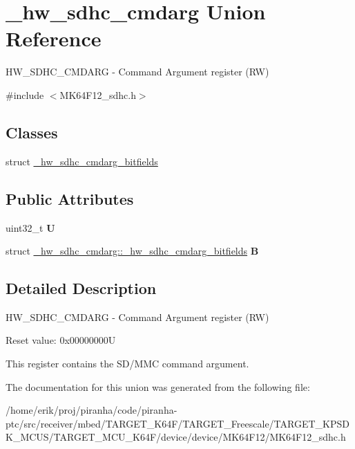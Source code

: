 \hypertarget{union__hw__sdhc__cmdarg}{}\section{\+\_\+hw\+\_\+sdhc\+\_\+cmdarg Union Reference}
\label{union__hw__sdhc__cmdarg}


H\+W\+\_\+\+S\+D\+H\+C\+\_\+\+C\+M\+D\+A\+RG -\/ Command Argument register (RW)  




{\ttfamily \#include $<$M\+K64\+F12\+\_\+sdhc.\+h$>$}

\subsection*{Classes}
\begin{DoxyCompactItemize}
\item 
struct \hyperlink{struct__hw__sdhc__cmdarg_1_1__hw__sdhc__cmdarg__bitfields}{\+\_\+hw\+\_\+sdhc\+\_\+cmdarg\+\_\+bitfields}
\end{DoxyCompactItemize}
\subsection*{Public Attributes}
\begin{DoxyCompactItemize}
\item 
uint32\+\_\+t {\bfseries U}\hypertarget{union__hw__sdhc__cmdarg_ace11d1953553df892385fde5b2fcf5ae}{}\label{union__hw__sdhc__cmdarg_ace11d1953553df892385fde5b2fcf5ae}

\item 
struct \hyperlink{struct__hw__sdhc__cmdarg_1_1__hw__sdhc__cmdarg__bitfields}{\+\_\+hw\+\_\+sdhc\+\_\+cmdarg\+::\+\_\+hw\+\_\+sdhc\+\_\+cmdarg\+\_\+bitfields} {\bfseries B}\hypertarget{union__hw__sdhc__cmdarg_ac779ce4e8a44258e2c36f37a4cb98b4e}{}\label{union__hw__sdhc__cmdarg_ac779ce4e8a44258e2c36f37a4cb98b4e}

\end{DoxyCompactItemize}


\subsection{Detailed Description}
H\+W\+\_\+\+S\+D\+H\+C\+\_\+\+C\+M\+D\+A\+RG -\/ Command Argument register (RW) 

Reset value\+: 0x00000000U

This register contains the S\+D/\+M\+MC command argument. 

The documentation for this union was generated from the following file\+:\begin{DoxyCompactItemize}
\item 
/home/erik/proj/piranha/code/piranha-\/ptc/src/receiver/mbed/\+T\+A\+R\+G\+E\+T\+\_\+\+K64\+F/\+T\+A\+R\+G\+E\+T\+\_\+\+Freescale/\+T\+A\+R\+G\+E\+T\+\_\+\+K\+P\+S\+D\+K\+\_\+\+M\+C\+U\+S/\+T\+A\+R\+G\+E\+T\+\_\+\+M\+C\+U\+\_\+\+K64\+F/device/device/\+M\+K64\+F12/M\+K64\+F12\+\_\+sdhc.\+h\end{DoxyCompactItemize}
